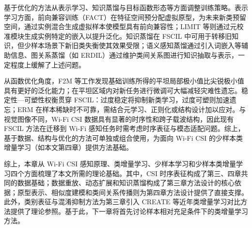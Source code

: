 
基于优化的方法从表示学习、知识蒸馏与目标函数形态等方面调整训练策略。表示学习方面，前向兼容训练（FACT）\cite{zhou2022fact}在特征空间预分配虚拟原型，为未来新类预留空间，通过实例混合生成虚拟样本使模型具有前向兼容性；LIMIT\cite{zhou2022limit} 等则通过元校准模块生成实例特定的嵌入以提升泛化。知识蒸馏在 FSCIL 中可用于转移旧知识，但少样本场景下新旧类失衡使其效果受限；语义感知蒸馏通过引入词嵌入等辅助信息、图关系蒸馏（如 ERDIL）通过维护类间关系图进行知识抽取与表示，一定程度上缓解了上述问题\cite{tian2024fscilsurvey}。

从函数优化角度，F2M\cite{shi2021f2m} 等工作发现基础训练所得的平坦局部极小值比尖锐极小值具有更好的泛化能力；在平坦区域内对新任务进行微调可大幅减轻灾难性遗忘。稳定性—可塑性权衡贯穿 FSCIL：过度稳定将抑制新类学习，过度可塑则加速遗忘；ERM 在样本稀缺时不可靠，需结合元学习、正则化或结构设计加以应对。与视觉图像不同，Wi-Fi CSI 数据具有显著的时序性和跨子载波结构，因此现有 FSCIL 方法在迁移到 Wi-Fi 感知任务时需考虑时序表征与模态适配问题。综上，基于数据、结构与优化的方法可单独或组合使用，为面向 Wi-Fi CSI 的少样本类增量学习（如本文第四章）提供方法基础。



综上，本章从 Wi-Fi CSI 感知原理、类增量学习、少样本学习和少样本类增量学习四个方面梳理了本文所需的理论基础。其中，CSI 时序表征构成了第三、四章共同的数据基础；数据重放、动态扩展和知识蒸馏构成了第三章方法设计的核心依据；原型表示、相似度建模和类间关系传播则为第四章方法设计提供了直接支撑。此外，类别表征与混淆抑制方法为第三章引入 CREATE\cite{chen2025create} 等近年类增量学习对比方法提供了理论参照。基于此，下一章将首先讨论样本相对充足条件下的类增量学习方法。
